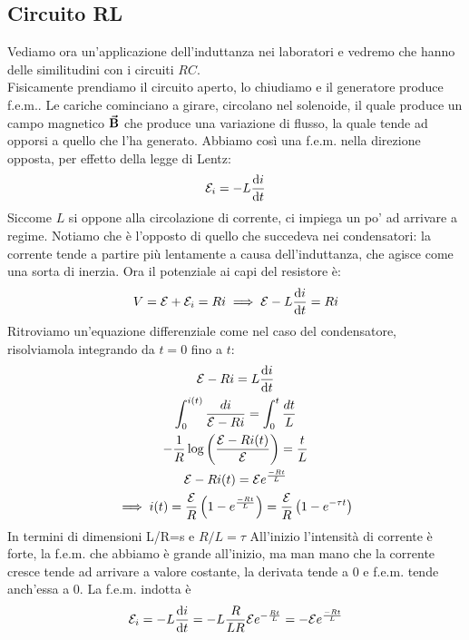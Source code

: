 \subsection{Circuito RL}
Vediamo ora un'applicazione dell'induttanza nei laboratori e vedremo che hanno delle similitudini con i circuiti $RC$.\\ 
Fisicamente prendiamo il circuito aperto, lo chiudiamo e il generatore produce f.e.m.. Le cariche cominciano a girare, circolano nel solenoide, il quale produce un campo magnetico $\vb*{\va{B}}$ che produce una variazione di flusso, la quale tende ad opporsi a quello che l'ha generato. Abbiamo così una f.e.m. nella direzione opposta, per effetto della legge di Lentz:
\begin{equation*}
	\mathcal{E}_i=-L\dv{i}{t}
\end{equation*}
Siccome $L$ si oppone alla circolazione di corrente, ci impiega un po' ad arrivare a regime. Notiamo che è l'opposto di quello che succedeva nei condensatori: la corrente tende a partire più lentamente a causa dell'induttanza, che agisce come una sorta di inerzia. Ora il potenziale ai capi del resistore è:
\begin{gather*}
	V=\mathcal{E}+\mathcal{E}_i=Ri \implies \mathcal{E}-L\dv{i}{t}=Ri\\
\end{gather*}
Ritroviamo un'equazione differenziale come nel caso del condensatore, risolviamola integrando da $t=0$ fino a $t$:
\begin{gather*}
	\mathcal{E}-Ri=L\dv{i}{t}\\
	\int_0^{i(t)}\frac{di}{\mathcal{E}-Ri}=\int_0^t\frac{dt}{L}\\
	-\frac{1}{R}\log\left( \frac{\mathcal{E}-Ri(t)}{\mathcal{E}}\right)=\frac{t}{L}\\
	\mathcal{E}-Ri(t)=\mathcal{E}e^{\frac{-Rt}{L}}\\
	\implies i(t)=\frac{\mathcal{E}}{R}\left( 1-e^{\frac{-Rt}{L}} \right)=\frac{\mathcal{E}}{R}\left( 1-e^{-\tau t}\right)
\end{gather*}
In termini di dimensioni L/R=s e $R/L=\tau$
All'inizio l'intensità di corrente è forte, la f.e.m. che abbiamo è grande all'inizio, ma man mano che la corrente cresce tende ad arrivare a valore costante, la derivata tende a $0$ e f.e.m. tende anch'essa a $0$. La f.e.m. indotta è
\begin{equation*}
	\mathcal{E}_i=-L\dv{i}{t}=-L\frac{R}{LR} \mathcal{E}e^{-\frac{Rt}{L}} =-\mathcal{E}e^{\frac{-Rt}{L}}
\end{equation*}

